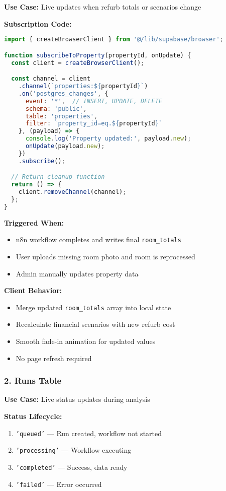 \documentclass[11pt,a4paper]{article}
\begin{document}
\textbf{Use Case:} Live updates when refurb totals or scenarios change

\textbf{Subscription Code:}
\begin{lstlisting}[language=JavaScript, caption=Property Subscription]
import { createBrowserClient } from '@/lib/supabase/browser';

function subscribeToProperty(propertyId, onUpdate) {
  const client = createBrowserClient();

  const channel = client
    .channel(`properties:${propertyId}`)
    .on('postgres_changes', {
      event: '*',  // INSERT, UPDATE, DELETE
      schema: 'public',
      table: 'properties',
      filter: `property_id=eq.${propertyId}`
    }, (payload) => {
      console.log('Property updated:', payload.new);
      onUpdate(payload.new);
    })
    .subscribe();

  // Return cleanup function
  return () => {
    client.removeChannel(channel);
  };
}
\end{lstlisting}

\textbf{Triggered When:}
\begin{itemize}
  \item n8n workflow completes and writes final \texttt{room\_totals}
  \item User uploads missing room photo and room is reprocessed
  \item Admin manually updates property data
\end{itemize}

\textbf{Client Behavior:}
\begin{itemize}
  \item Merge updated \texttt{room\_totals} array into local state
  \item Recalculate financial scenarios with new refurb cost
  \item Smooth fade-in animation for updated values
  \item No page refresh required
\end{itemize}

\subsubsection{2. Runs Table}

\textbf{Use Case:} Live status updates during analysis

\textbf{Status Lifecycle:}
\begin{enumerate}
  \item \texttt{'queued'} — Run created, workflow not started
  \item \texttt{'processing'} — Workflow executing
  \item \texttt{'completed'} — Success, data ready
  \item \texttt{'failed'} — Error occurred
\end{enumerate}
\end{document}
